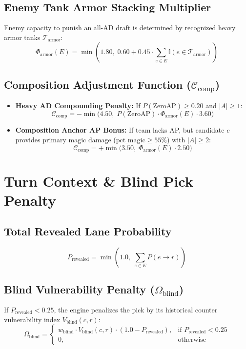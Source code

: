 \documentclass[11pt,a4paper]{article}
\begin{document}
\subsection{Enemy Tank Armor Stacking Multiplier}
Enemy capacity to punish an all-AD draft is determined by recognized heavy armor tanks $\mathcal{T}_{\text{armor}}$:
\begin{equation}
\Phi_{\text{armor}}(E) = \min\left(1.80, \; 0.60 + 0.45 \cdot \sum_{e \in E} \mathbb{I}(e \in \mathcal{T}_{\text{armor}})\right)
\end{equation}

\subsection{Composition Adjustment Function ($\mathcal{C}_{\text{comp}}$)}
\begin{itemize}
  \item \textbf{Heavy AD Compounding Penalty:} If $P(\text{ZeroAP}) \ge 0.20$ and $|A| \ge 1$:
  \begin{equation}
  \mathcal{C}_{\text{comp}} = - \min\big(4.50, \; P(\text{ZeroAP}) \cdot \Phi_{\text{armor}}(E) \cdot 3.60\big)
  \end{equation}
  \item \textbf{Composition Anchor AP Bonus:} If team lacks AP, but candidate $c$ provides primary magic damage ($\text{pct\_magic} \ge 55\%$) with $|A| \ge 2$:
  \begin{equation}
  \mathcal{C}_{\text{comp}} = + \min\big(3.50, \; \Phi_{\text{armor}}(E) \cdot 2.50\big)
  \end{equation}
\end{itemize}

\section{Turn Context \& Blind Pick Penalty}

\subsection{Total Revealed Lane Probability}
\begin{equation}
P_{\text{revealed}} = \min\left(1.0, \; \sum_{e \in E} P(e \to r)\right)
\end{equation}

\subsection{Blind Vulnerability Penalty ($\Omega_{\text{blind}}$)}
If $P_{\text{revealed}} < 0.25$, the engine penalizes the pick by its historical counter vulnerability index $V_{\text{blind}}(c, r)$:
\begin{equation}
\Omega_{\text{blind}} = 
\begin{cases}
w_{\text{blind}} \cdot V_{\text{blind}}(c, r) \cdot (1.0 - P_{\text{revealed}}), & \text{if } P_{\text{revealed}} < 0.25 \\
0, & \text{otherwise}
\end{cases}
\end{equation}
\end{document}
